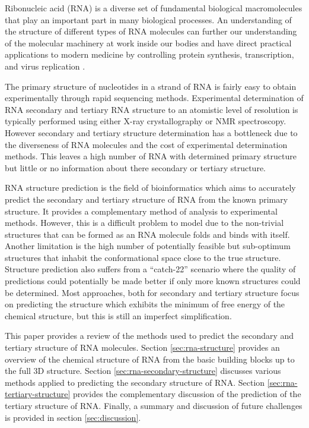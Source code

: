 \documentclass[journal]{IEEEtran}
\begin{document}
Ribonucleic acid (RNA) is a diverse set of fundamental biological macromolecules that play an important part in many biological processes. An understanding of the structure of different types of RNA molecules can further our understanding of the molecular machinery at work inside our bodies and have direct practical applications to modern medicine by controlling protein synthesis, transcription, and virus replication \cite{schlick2010molecular}.

The primary structure of nucleotides in a strand of RNA is fairly easy to obtain experimentally through rapid sequencing methods. Experimental determination of RNA secondary and tertiary RNA structure to an atomistic level of resolution is typically performed using either X-ray crystallography or NMR spectroscopy. However secondary and tertiary structure determination has a bottleneck due to the diverseness of RNA molecules and the cost of experimental determination methods\cite{ya2014rna}. This leaves a high number of RNA with determined primary structure but little or no information about there secondary or tertiary structure.

RNA structure prediction is the field of bioinformatics which aims to accurately predict the secondary and tertiary structure of RNA from the known primary structure. It provides a complementary method of analysis to experimental methods. However, this is a difficult problem to model due to the non-trivial structures that can be formed as an RNA molecule folds and binds with itself. Another limitation is the high number of potentially feasible but sub-optimum structures that inhabit the conformational space close to the true structure. Structure prediction also suffers from a ``catch-22'' scenario where the quality of predictions could potentially be made better if only more known structures could be determined. Most approaches, both for secondary and tertiary structure focus on predicting the structure which exhibits the minimum of free energy of the chemical structure, but this is still an imperfect simplification.

This paper provides a review of the methods used to predict the secondary and tertiary structure of RNA molecules. Section \ref{sec:rna-structure} provides an overview of the chemical structure of RNA from the basic building blocks up to the full 3D structure. Section \ref{sec:rna-secondary-structure} discusses various methods applied to predicting the secondary structure of RNA. Section \ref{sec:rna-tertiary-structure} provides the complementary discussion of the prediction of the tertiary structure of RNA. Finally, a summary and discussion of future challenges is provided in section \ref{sec:discussion}.
\end{document}
